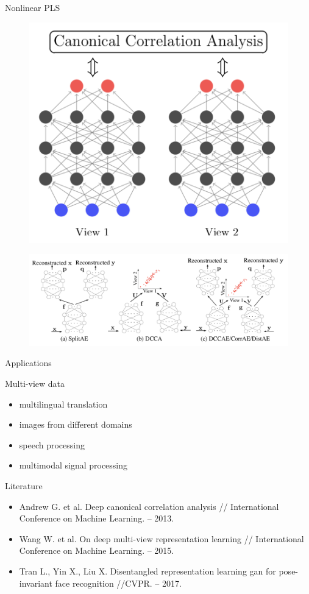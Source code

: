 \documentclass[9pt]{beamer}
\begin{document}
\begin{frame}{Nonlinear PLS}

\begin{figure}
	\includegraphics[width=0.4\linewidth]{figs/DeepCCA}
\end{figure}
\begin{figure}
	\includegraphics[width=\linewidth]{figs/DeepCCAAE}
\end{figure}

\end{frame}
\begin{frame}{Applications}

\begin{block}{Multi-view data}
\begin{itemize}
	\item multilingual translation
	\item images from different domains
	\item speech processing
	\item multimodal signal processing
\end{itemize}
\end{block}

\begin{block}{Literature}
	\begin{itemize}
		\item Andrew G. et al. Deep canonical correlation analysis // International Conference on Machine Learning. – 2013.
		\item Wang W. et al. On deep multi-view representation learning // International Conference on Machine Learning. – 2015.
		\item Tran L., Yin X., Liu X. Disentangled representation learning gan for pose-invariant face recognition //CVPR. – 2017.
	\end{itemize}
\end{block}
\end{frame}
\end{document}
